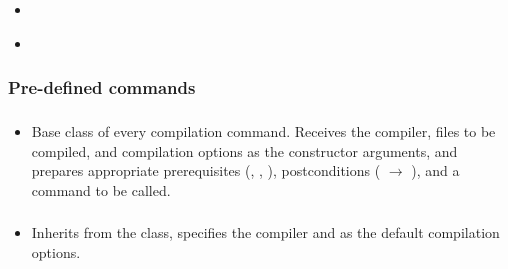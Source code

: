 \begin{itemize}[label={}]
    \item {} \label{sec:get_user} 

    \item {} \label{sec:get_group} 
\end{itemize}

\subsubsection{Pre-defined commands}\label{subsec:predefined_commands}

\subsubsection*{}\label{subsec:CompileBase}

\begin{itemize}[label={}]
    \item Base class of every compilation command.
          Receives the compiler, files to be compiled, and compilation options as the constructor arguments, and prepares
          appropriate prerequisites
          (\hyperref[subsec:ProgramExistsPrerequisite]{},
          \hyperref[subsec:FileExistsPrerequisite]{},
          \hyperref[subsec:NonEmptyListPrerequisite]{}
          ), postconditions (
          \hyperref[subsec:ExitCodePostcondition]{} $\rightarrow$ 
          ), and a command to be called.
\end{itemize}

\subsubsection*{}\label{subsec:CompileNasm}

\begin{itemize}[label={}]
    \item Inherits from the \hyperref[subsec:CompileBase]{} class, specifies the 
          compiler and  as the default compilation options.
\end{itemize}

